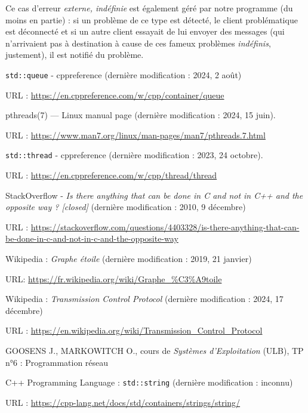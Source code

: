 \documentclass{article}
\begin{document}
Ce cas d'erreur \textit{externe, indéfinie} est également géré par notre programme (du moins en partie) : si un problème de ce type est détecté, le client problématique est déconnecté et si un autre client essayait de lui envoyer des messages (qui n'arrivaient pas à destination à cause de ces fameux problèmes \textit{indéfinis}, justement), il est notifié du problème.

\begin{thebibliography}{999}
    \texttt{std::queue} - cppreference (dernière modification : 2024, 2 août)

    URL : \url{https://en.cppreference.com/w/cpp/container/queue}

        pthreads(7) — Linux manual page (dernière modification : 2024, 15 juin).

        URL : \url{https://www.man7.org/linux/man-pages/man7/pthreads.7.html}

        \texttt{std::thread} - cppreference (dernière modification : 2023, 24 octobre).

        URL : \url{https://en.cppreference.com/w/cpp/thread/thread}

        StackOverflow - \textit{Is there anything that can be done in C and not in C++ and the opposite way ? [closed]} (dernière modification : 2010, 9 décembre)

    URL : \url{https://stackoverflow.com/questions/4403328/is-there-anything-that-can-be-done-in-c-and-not-in-c-and-the-opposite-way}

		Wikipedia : \textit{Graphe étoile} (dernière modification : 2019, 21 janvier)

        URL: \url{https://fr.wikipedia.org/wiki/Graphe_%C3%A9toile}

    Wikipedia : \textit{Transmission Control Protocol} (dernière modification : 2024, 17 décembre)

    URL : \url{https://en.wikipedia.org/wiki/Transmission_Control_Protocol}

    GOOSENS J., MARKOWITCH O., cours de \textit{Systèmes d'Exploitation} (ULB), TP n°6 : Programmation réseau

    C++ Programming Language : \texttt{std::string} (dernière modification : inconnu)

    URL : \url{https://cpp-lang.net/docs/std/containers/strings/string/}


\end{thebibliography}
\end{document}

